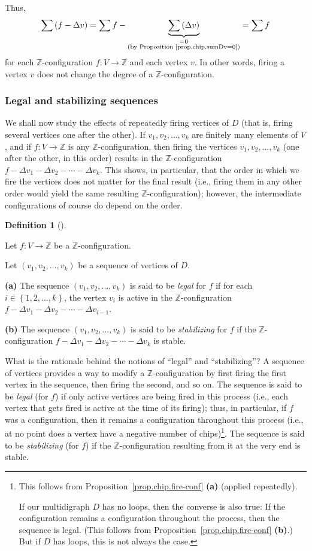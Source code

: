 \documentclass[numbers=enddot,12pt,final,onecolumn,notitlepage]{scrartcl}%
\theoremstyle{definition}
\newtheorem{defi}[theo]{Definition}
\newenvironment{definition}[1][]
{\begin{defi}[#1]\begin{leftbar}}
{\end{leftbar}\end{defi}}
\let\sumnonlimits\sum
\renewcommand{\sum}{\sumnonlimits\limits}
\newcommand{\ZZ}{\mathbb{Z}}
\newcommand{\set}[1]{\left\{ #1 \right\}}
\newcommand{\tup}[1]{\left( #1 \right)}
\newcommand{\underbrack}[2]{\underbrace{#1}_{\substack{#2}}}
\begin{document}
Thus,
\[
\sum \tup{f - \Delta v}
= \sum f - \underbrack{\sum \tup{\Delta v}}{= 0 \\ \text{(by Proposition~\ref{prop.chip.sumDv=0})}}
= \sum f
\]
for each $\ZZ$-configuration $f : V \to \ZZ$ and each vertex $v$.
In other words, firing a vertex $v$ does not change the degree of
a $\ZZ$-configuration.

\subsubsection{Legal and stabilizing sequences}

We shall now study the effects of repeatedly firing vertices
of $D$ (that is, firing several vertices one after the other).
If $v_1, v_2, \ldots, v_k$ are finitely many elements of $V$,
and if $f : V \to \ZZ$ is any $\ZZ$-configuration,
then firing the vertices $v_1, v_2, \ldots, v_k$
(one after the other, in this order) results in the
$\ZZ$-configuration
$f - \Delta v_1 - \Delta v_2 - \cdots - \Delta v_k$.
This shows, in particular, that the order in which we fire
the vertices does not matter for the final result
(i.e., firing them in any other order would yield the same
resulting $\ZZ$-configuration);
however, the intermediate configurations of course do depend
on the order.

\begin{definition}
Let $f : V \to \ZZ$ be a $\ZZ$-configuration.

Let $\tup{v_1, v_2, \ldots, v_k}$ be a sequence of vertices of
$D$.

\textbf{(a)} The sequence $\tup{v_1, v_2, \ldots, v_k}$ is said
to be \textit{legal} for $f$ if for each
$i \in \set{1, 2, \ldots, k}$, the vertex $v_i$ is active in
the $\ZZ$-configuration
$f - \Delta v_1 - \Delta v_2 - \cdots - \Delta v_{i-1}$.

\textbf{(b)} The sequence $\tup{v_1, v_2, \ldots, v_k}$ is said
to be \textit{stabilizing} for $f$ if the $\ZZ$-configuration
$f - \Delta v_1 - \Delta v_2 - \cdots - \Delta v_k$ is stable.
\end{definition}

What is the rationale behind the notions of ``legal'' and
``stabilizing''?
A sequence of vertices provides a way to modify a
$\ZZ$-configuration by first firing the first vertex in the
sequence, then firing the second, and so on.
The sequence is said to be \textit{legal} (for $f$) if only
active vertices are being fired in this process
(i.e., each vertex that gets fired is active at the time of
its firing);
thus, in particular, if $f$ was a configuration, then
it remains a configuration throughout this process
(i.e., at no point does a vertex have a negative number of
chips)\footnote{This follows from
Proposition~\ref{prop.chip.fire-conf} \textbf{(a)}
(applied repeatedly).
\par
If our multidigraph $D$ has no loops, then
the converse is also true:
If the configuration remains a configuration throughout the
process, then the sequence is legal.
(This follows from
Proposition~\ref{prop.chip.fire-conf} \textbf{(b)}.)
But if $D$ has loops, this is not always the case.}.
The sequence is said to be \textit{stabilizing} (for $f$) if
the $\ZZ$-configuration resulting from it at the very end is
stable.
\end{document}
